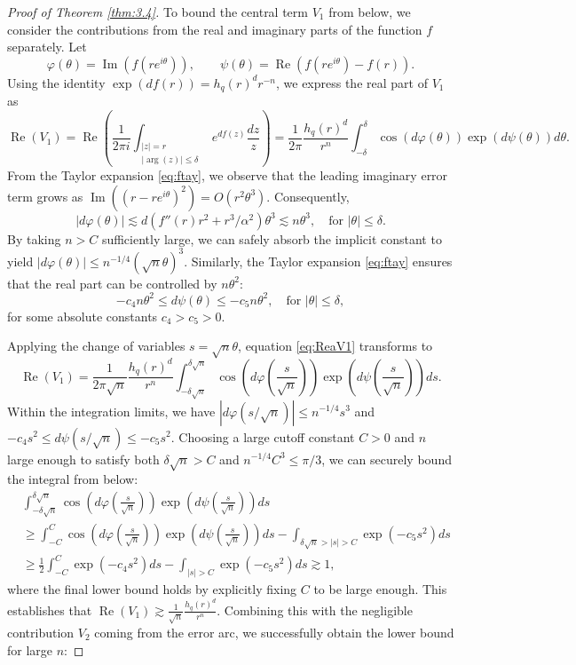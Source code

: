 \documentclass[a4paper,twoside, reqno]{amsart}
\numberwithin{equation}{section}
\theoremstyle{definition}%
\theoremstyle{definition}
\theoremstyle{definition}%
\theoremstyle{definition}
\DeclareMathOperator{\Ima}{Im}
\DeclareMathOperator{\Rea}{Re}
\begin{document}
\begin{proof}[Proof of Theorem \ref{thm:3.4}]
To bound the central term $V_1$ from below, we consider the contributions from the real and imaginary parts of the function $f$ separately. Let 
\[
    \varphi(\theta) = \Ima(f(re^{i\theta})), \qquad \psi(\theta) = \Rea(f(re^{i\theta}) - f(r)).
\]
Using the identity $\exp(d f(r)) = h_q(r)^d r^{-n}$, we express the real part of $V_1$ as
\begin{equation} \label{eq:ReaV1}
    \Rea(V_1) = \Rea\left( \frac{1}{2 \pi i} \int_{\substack{|z|=r \\ |\arg(z)| \leq \delta}} e^{d f(z)} \frac{dz}{z} \right) = \frac{1}{2\pi} \frac{h_q(r)^d}{r^n} \int_{-\delta}^{\delta} \cos(d\varphi(\theta)) \exp(d\psi(\theta)) d\theta.
\end{equation}
From the Taylor expansion \eqref{eq:ftay}, we observe that the leading imaginary error term grows as $\Ima((r - r e^{i\theta})^2) = O(r^2 \theta^3)$. Consequently,
\[
    |d\varphi(\theta)| \lesssim d(f''(r) r^2 + r^3/\alpha^2)\theta^3 \lesssim n \theta^3, \quad \text{for } |\theta| \leq \delta.
\]
By taking $n > C$ sufficiently large, we can safely absorb the implicit constant to yield $|d\varphi(\theta)| \leq n^{-1/4}(\sqrt{n}\theta)^3$. 
Similarly, the Taylor expansion \eqref{eq:ftay} ensures that the real part can be controlled by $n\theta^2$:
\[
    -c_4 n \theta^2 \leq d\psi(\theta) \leq -c_5 n \theta^2, \quad \text{for } |\theta| \leq \delta,
\]
for some absolute constants $c_4 > c_5 > 0$. 

Applying the change of variables $s = \sqrt{n}\theta$, equation \eqref{eq:ReaV1} transforms to
\[
    \Rea(V_1) = \frac{1}{2\pi\sqrt{n}} \frac{h_q(r)^d}{r^n} \int_{-\delta\sqrt{n}}^{\delta\sqrt{n}} \cos\left(d\varphi\left(\frac{s}{\sqrt{n}}\right)\right) \exp\left(d\psi\left(\frac{s}{\sqrt{n}}\right)\right) ds.
\]
Within the integration limits, we have $|d\varphi(s/\sqrt{n})| \leq n^{-1/4} s^3$ and $-c_4 s^2 \leq d\psi(s/\sqrt{n}) \leq -c_5 s^2$. 
Choosing a large cutoff constant $C > 0$ 
and $n$ large enough to satisfy both $\delta\sqrt{n} > C$ and $n^{-1/4}C^3 \leq \pi/3$, we can securely bound the integral from below:
\begin{align*}
    &\int_{-\delta\sqrt{n}}^{\delta\sqrt{n}} \cos\left(d\varphi\left(\frac{s}{\sqrt{n}}\right)\right) \exp\left(d\psi\left(\frac{s}{\sqrt{n}}\right)\right) ds \\
    &\geq \int_{-C}^C \cos\left(d\varphi\left(\frac{s}{\sqrt{n}}\right)\right) \exp\left(d\psi\left(\frac{s}{\sqrt{n}}\right)\right) ds - \int_{\delta\sqrt{n} > |s| > C} \exp(-c_5 s^2) ds \\
    &\geq \frac{1}{2} \int_{-C}^C \exp(-c_4 s^2) ds - \int_{|s| > C} \exp(-c_5 s^2) ds \gtrsim 1,
\end{align*}
where the final lower bound holds by explicitly fixing $C$ to be large enough. 
This establishes that $\Rea(V_1) \gtrsim \frac{1}{\sqrt{n}} \frac{h_q(r)^d}{r^n}$. 
Combining this with the negligible contribution $V_2$ coming from the error arc, we successfully obtain the lower bound for large $n$:


\end{proof}
\end{document}
